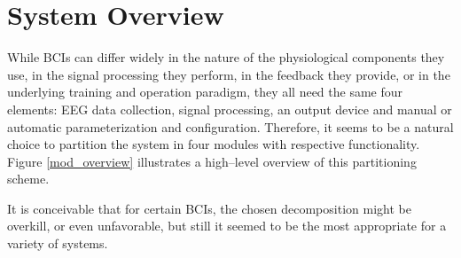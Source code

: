 \chapter{System Overview}

While BCIs can differ widely in the nature of the physiological components they 
use, in the signal processing they perform, in the feedback they provide, or in 
the underlying training and operation paradigm, they all need the same four 
elements: EEG data collection, signal processing, an output device and manual or 
automatic parameterization and configuration. Therefore, it seems to be a 
natural choice to partition the system in four modules with respective 
functionality. Figure \ref{mod_overview} illustrates a high--level overview of 
this partitioning scheme. 

It is conceivable that for certain BCIs, the chosen decomposition might be 
overkill, or even unfavorable, but still it seemed to be the most appropriate 
for a variety of systems.
